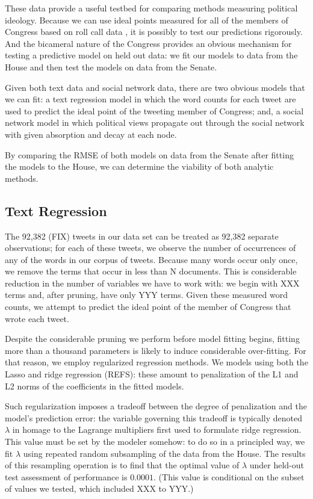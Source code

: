 \documentclass[11pt]{article}
\begin{document}
These data provide a useful testbed for comparing methods measuring political ideology. Because we can use ideal points measured for all of the members of Congress based on roll call data \citep{Jackman_2001}, it is possibly to test our predictions rigorously. And the bicameral nature of the Congress provides an obvious mechanism for testing a predictive model on held out data: we fit our models to data from the House and then test the models on data from the Senate.

Given both text data and social network data, there are two obvious models that we can fit: a text regression model in which the word counts for each tweet are used to predict the ideal point of the tweeting member of Congress; and, a social network model in which political views propagate out through the social network with given absorption and decay at each node.

By comparing the RMSE of both models on data from the Senate after fitting the models to the House, we can determine the viability of both analytic methods.

\subsection{Text Regression}
The 92,382 (FIX) tweets in our data set can be treated as 92,382 separate observations; for each of these tweets, we observe the number of occurrences of any of the words in our corpus of tweets. Because many words occur only once, we remove the terms that occur in less than N documents. This is considerable reduction in the number of variables we have to work with: we begin with XXX terms and, after pruning, have only YYY terms. Given these measured word counts, we attempt to predict the ideal point of the member of Congress that wrote each tweet.

Despite the considerable pruning we perform before model fitting begins, fitting more than a thousand parameters is likely to induce considerable over-fitting. For that reason, we employ regularized regression methods. We models using both the Lasso and ridge regression (REFS): these amount to penalization of the L1 and L2 norms of the coefficients in the fitted models.

Such regularization imposes a tradeoff between the degree of penalization and the model's prediction error: the variable governing this tradeoff is typically denoted $\lambda$ in homage to the Lagrange multipliers first used to formulate ridge regression. This value must be set by the modeler somehow: to do so in a principled way, we fit $\lambda$ using repeated random subsampling of the data from the House. The results of this resampling operation is to find that the optimal value of $\lambda$ under held-out test assessment of performance is $0.0001$. (This value is conditional on the subset of values we tested, which included XXX to YYY.)
\end{document}
